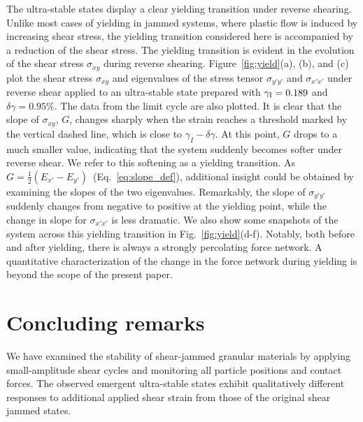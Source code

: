 \documentclass[twocolumn,showkeys,superscriptaddress,preprintnumbers,amsmath,amssymb,showpacs,prx,longbibliography]{revtex4-2}
\begin{document}
\begin{CJK*}{UTF8}{gbsn}
The ultra-stable states display a clear yielding transition  under reverse shearing. 
Unlike most cases of yielding in jammed systems, where plastic flow is induced by increasing shear stress, the yielding transition considered here is accompanied by a reduction of the shear stress. The yielding transition is evident in the evolution of the shear stress $\sigma_{xy}$
during reverse shearing. 
Figure~\ref{fig:yield}(a), (b), and (c) plot the
shear stress $\sigma_{xy}$ and  eigenvalues of the stress tensor $\sigma_{y'y'}$ and $\sigma_{x'x'}$
under reverse shear applied to an ultra-stable state prepared with $\gamma_{\rm I} = 
0.189$ and $\delta\gamma = 0.95\%$. The data from the limit cycle are also plotted. 
It is clear that the slope of $\sigma_{xy}$, $G$, changes sharply
when the strain reaches a threshold 
marked by the vertical dashed line, which is close to $\gamma_I - \delta\gamma$. At this point, $G$ drops to a much smaller value, indicating that the system suddenly becomes softer under reverse shear. We refer to this softening as a yielding transition. As $G=\frac{1}{2}(E_{x'}-E_{y'})$~(Eq.~\ref{eq:slope_def}), additional insight could be obtained by examining the slopes of the two eigenvalues. Remarkably, the slope of $\sigma_{y'y'}$ suddenly changes from negative to positive at the yielding point, while
the change in slope for 
$\sigma_{x'x'}$ is less dramatic. We also show some snapshots of the system across this yielding transition in Fig.~\ref{fig:yield}(d-f). 
{\color{black} Notably, both before and after yielding, there is always a strongly percolating force network. A quantitative characterization of the change in the force network during yielding is beyond the scope of the present paper.}

\section{Concluding remarks}\label{sec_discussion}

We have examined the stability of shear-jammed granular materials by applying small-amplitude shear cycles and monitoring all particle positions and contact forces. The observed emergent ultra-stable states exhibit qualitatively different responses to additional applied shear strain from those of the original shear jammed states. 


\end{CJK*}
\end{document}
